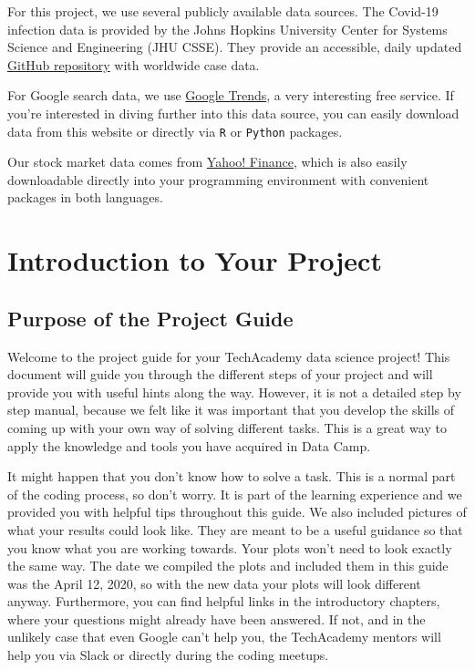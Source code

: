 \documentclass[
  11pt,
]{article}
\begin{document}
For this project, we use several publicly available data sources. The Covid-19 infection data is provided by the Johns Hopkins University Center for Systems Science and Engineering (JHU CSSE). They provide an accessible, daily updated \href{https://github.com/CSSEGISandData/COVID-19}{GitHub repository} with worldwide case data.

For Google search data, we use \href{https://trends.google.com/}{Google Trends}, a very interesting free service. If you're interested in diving further into this data source, you can easily download data from this website or directly via \texttt{R} or \texttt{Python} packages.

Our stock market data comes from \href{finance.yahoo.com}{Yahoo! Finance}, which is also easily downloadable directly into your programming environment with convenient packages in both languages.

\newpage

\hypertarget{introduction-to-your-project}{%
\section{Introduction to Your Project}\label{introduction-to-your-project}}

\hypertarget{purpose-of-the-project-guide}{%
\subsection{Purpose of the Project Guide}\label{purpose-of-the-project-guide}}

Welcome to the project guide for your TechAcademy data science project! This document will guide you through the different steps of your project and will provide you with useful hints along the way. However, it is not a detailed step by step manual, because we felt like it was important that you develop the skills of coming up with your own way of solving different tasks. This is a great way to apply the knowledge and tools you have acquired in Data Camp.

It might happen that you don't know how to solve a task. This is a normal part of the coding process, so don't worry. It is part of the learning experience and we provided you with helpful tips throughout this guide. We also included pictures of what your results could look like. They are meant to be a useful guidance so that you know what you are working towards. Your plots won't need to look exactly the same way. The date we compiled the plots and included them in this guide was the April 12, 2020, so with the new data your plots will look different anyway.
Furthermore, you can find helpful links in the introductory chapters, where your questions might already have been answered. If not, and in the unlikely case that even Google can't help you, the TechAcademy mentors will help you via Slack or directly during the coding meetups.
\end{document}
